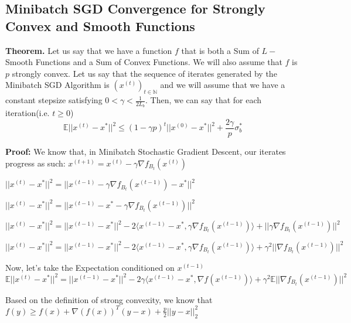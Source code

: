 \subsection{Minibatch SGD Convergence for Strongly Convex and Smooth Functions}
\noindent \textbf{Theorem.} Let us say that we have a function $f$ that is both a Sum of $L-$Smooth Functions and a Sum of Convex Functions. We will also assume that $f$ is $p$ strongly convex. Let us say that the sequence of iterates generated by the Minibatch SGD Algorithm is $(x^{(t)})_{t \in \mathbb{N}}$ and we will assume that we have a constant stepsize satisfying $0 < \gamma < \frac{1}{2L_{b}}$. Then, we can say that for each iteration(i.e. $t \geq 0$) 
\begin{equation}
    \mathbb{E}||x^{(t)} - x^*||^2 \leq (1 - \gamma p)^t ||x^{(0)} - x^*||^2 + \frac{2 \gamma}{p} \sigma_b^*
\end{equation}

\noindent \textbf{Proof:} \newline 
We know that, in Minibatch Stochastic Gradient Descent, our iterates progress as such: $x^{(t + 1)}  = x^{(t)} - \gamma \nabla f_{B_t}(x^{(t)})$ \newline 

$||x^{(t)} - x^*||^2 = ||x^{(t - 1)} - \gamma \nabla f_{B_t}(x^{(t - 1)}) - x^*||^2$ \newline 

$||x^{(t)} - x^*||^2 = ||x^{(t - 1)} - x^* - \gamma \nabla f_{B_t}(x^{(t - 1)})||^2$ \newline 


$||x^{(t)} - x^*||^2 = ||x^{(t - 1)} - x^*||^2 - 2\langle x^{(t - 1)} - x^*,  \gamma \nabla f_{B_t}(x^{(t - 1)})\rangle + ||\gamma \nabla f_{B_t}(x^{(t - 1)})||^2$

$||x^{(t)} - x^*||^2 = ||x^{(t - 1)} - x^*||^2 - 2\langle x^{(t - 1)} - x^*,  \gamma \nabla f_{B_t}(x^{(t - 1)})\rangle + \gamma^2 ||\nabla f_{B_t}(x^{(t - 1)})||^2$

Now, let's take the Expectation conditioned on $x^{(t - 1)}$ \newline 
$\mathbb{E}||x^{(t)} - x^*||^2 = ||x^{(t - 1)} - x^*||^2 - 2\gamma \langle x^{(t - 1)} - x^*,  \nabla f(x^{(t - 1)})\rangle + \gamma^2 \mathbb{E} ||\nabla f_{B_t}(x^{(t - 1)})||^2$ \newline 


Based on the definition of strong convexity, we know that $f(y) \geq f(x) + \nabla(f(x))^T (y - x) + \frac{p}{2} ||y - x||^2_2$ \newline 


